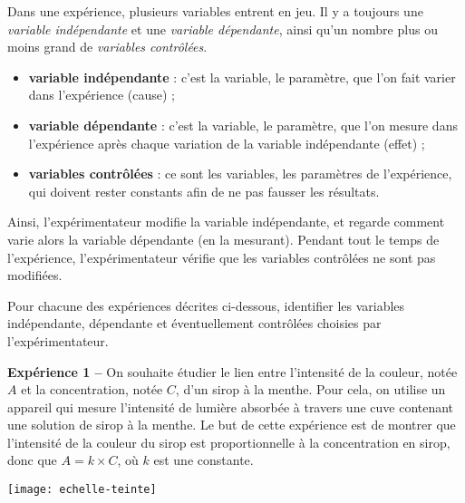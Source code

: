 \begin{activite}

\begin{partie}

Dans une expérience, plusieurs variables entrent en jeu. Il y a toujours une \emph{variable indépendante} et une \emph{variable dépendante}, ainsi qu'un nombre plus ou moins grand de \emph{variables contrôlées}.   

\begin{itemize}
\item \textbf{variable indépendante} : c'est la variable, le paramètre, que l'on fait varier dans l'expérience (cause) ;
\item \textbf{variable dépendante} : c'est la variable, le paramètre, que l'on mesure dans l'expérience après chaque variation de la variable indépendante (effet) ;
\item \textbf{variables contrôlées} : ce sont les variables, les paramètres de l'expérience, qui doivent rester constants afin de ne pas fausser les résultats. 
\end{itemize}

Ainsi, l'expérimentateur modifie la variable indépendante, et regarde comment varie alors la variable dépendante (en la mesurant). Pendant tout le temps de l'expérience, l'expérimentateur vérifie que les variables contrôlées ne sont pas modifiées.
\end{partie}

\begin{partie}

Pour chacune des expériences décrites ci-dessous, identifier les variables indépendante, dépendante et éventuellement contrôlées choisies par l'expérimentateur.

\vspace{1em}

{\footnotesize 

\begin{minipage}[c]{.68\linewidth}
\textbf{Expérience 1 --} On souhaite étudier le lien entre l'intensité de la couleur, notée $A$ et la concentration, notée $C$, d'un sirop à la menthe. Pour cela, on utilise un appareil qui mesure l'intensité de lumière absorbée à travers une cuve contenant une solution de sirop à la menthe. Le but de cette expérience est de montrer que l'intensité de la couleur du sirop est proportionnelle à la concentration en sirop, donc que $A = k \times C$, où $k$ est une constante.
\end{minipage}\hfill%
\begin{minipage}[c]{.28\linewidth}
\centering
\texttt{[image: echelle-teinte]}
\end{minipage}


}
\end{partie}
\end{activite}

